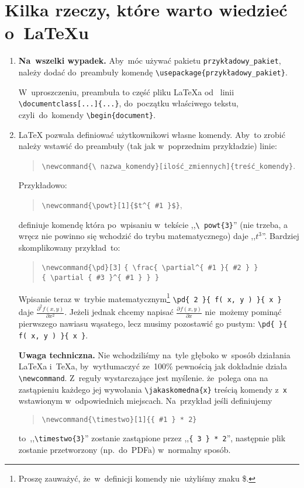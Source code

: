 \documentclass[a4paper,11pt]{article}
\newcommand{\tbs}{\textbackslash}  %
\newcommand{\tb}{\textbf}
\newcommand{\powt}[1]{$t^{ #1 }$}
\newcommand{\pd}[3]{ \frac{ \partial^{ #1 } { #2 } }
  { \partial { #3 }^{ #1 } } }
\begin{document}
\section{Kilka rzeczy, które warto wiedzieć o~\LaTeX u}
\label{sec:kilkarzeczy}

\begin{enumerate}
\item \tb{Na~wszelki wypadek.} Aby~móc używać pakietu
  \texttt{przykładowy\_pakiet}, należy dodać do~preambuły komendę
  \texttt{\tbs usepackage\{przykładowy\_pakiet\}}.

  W~uproszczeniu, preambuła to część pliku \LaTeX a od~ linii
  \texttt{\tbs documentclass[...]\{...\}}, do~początku właściwego
  tekstu, czyli~do~komendy \texttt{\tbs begin\{document\}}.
\item \LaTeX{} pozwala definiować użytkownikowi własne komendy. Aby~to
  zrobić należy wstawić do preambuły (tak jak w~poprzednim
  przykładzie) linie:
  \begin{quote}
    \texttt{\tbs newcommand\{\tbs
      nazwa\_komendy\}[ilość\_zmiennych]\{treść\_komendy\}}.
  \end{quote}
  Przykładowo:
  \begin{quote}
    \texttt{\tbs newcommand\{\tbs powt\}}\verb+[1]{$t^{ #1 }$}+,
  \end{quote}
  definiuje komendę która po~wpisaniu w~tekście ,,\texttt{\tbs
    powt\{3\}}'' (nie trzeba, a wręcz nie powinno się wchodzić do
  trybu matematycznego) daje ,,\powt{3}''. Bardziej skomplikowany
  przykład~to:
  \begin{quote}
    \texttt{\tbs newcommand\{\tbs pd\}}\verb+[3]+
    \texttt{\{ \tbs frac\{ \tbs partial\^{}\{ \#1 \}\{ \#2 \} \}} \\
    \texttt{\{ \tbs partial \{ \#3 \}\^{}\{ \#1 \} \} \}}
  \end{quote}
  Wpisanie teraz w~trybie matematycznym\footnote{Proszę zauważyć,
    że~w~definicji komendy nie~użyliśmy znaku \$.} \texttt{\tbs pd\{ 2
    \}\{ f( x, y ) \}\{ x \}} daje $\pd{ 2 }{ f( x, y ) }{ x }$.
  Jeżeli jednak chcemy napisać $\pd{}{ f( x, y ) }{ x }$ nie~możemy
  pominąć pierwszego nawiasu wąsatego, lecz musimy pozostawić go
  pustym: \texttt{\tbs pd\{ \}\{ f( x, y ) \}\{ x \}}.

  \textbf{Uwaga techniczna.} Nie wchodziliśmy na~tyle głęboko w~sposób
  działania \LaTeX a i~\TeX a, by~wytłumaczyć ze~100\% pewnością jak
  dokładnie działa \texttt{\tbs newcommand}. Z~reguły wystarczające
  jest myślenie. że~polega ona na zastąpieniu każdego jej wywołania
  \texttt{\tbs jakaskomedna\{x\}} treścią komendy z~\texttt{x}
  wstawionym w~odpowiednich miejscach. Na~przykład jeśli definiujemy
  \begin{quote}
    \texttt{\tbs newcommand\{\tbs timestwo\}[1]\{\{ \#1 \} * 2\}}
  \end{quote}
  to~,,\texttt{\tbs timestwo\{3\}}'' zostanie zastąpione przez
  ,,\texttt{\{ 3 \} * 2}'', następnie plik zostanie przetworzony
  (np.~do~PDFa) w~normalny sposób.


\end{enumerate}
\end{document}
